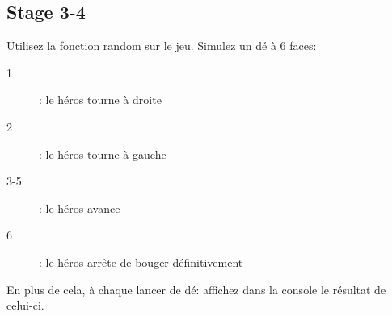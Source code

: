 \subsection{Stage 3-4}

Utilisez la fonction random sur le jeu.
Simulez un dé à 6 faces:
\begin{description}
	\item[1]: le héros tourne à droite
	\item[2]: le héros tourne à gauche
	\item[3-5]: le héros avance
	\item[6]: le héros arrête de bouger définitivement
\end{description}

En plus de cela, à chaque lancer de dé: affichez dans la console le résultat de celui-ci.


